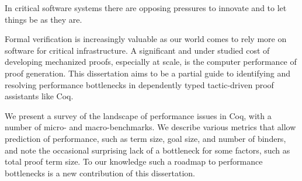 %
%
%
%
%
%
In critical software systems there are opposing pressures to innovate and to let things be as they are.


Formal verification is increasingly valuable as our world comes to rely more on software for critical infrastructure.
A significant and under studied cost of developing mechanized proofs, especially at scale, is the computer performance of proof generation.
This dissertation aims to be a partial guide to identifying and resolving performance bottlenecks in dependently typed tactic-driven proof assistants like Coq.

We present a survey of the landscape of performance issues in Coq, with a number of micro- and macro-benchmarks.
We describe various metrics that allow prediction of performance, such as term size, goal size, and number of binders, and note the occasional surprising lack of a bottleneck for some factors, such as total proof term size.
To our knowledge such a roadmap to performance bottlenecks is a new contribution of this dissertation.

